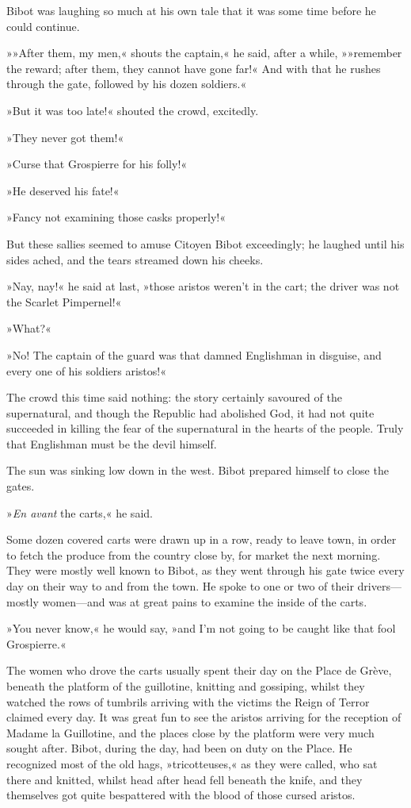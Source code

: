 Bibot was laughing so much at his own tale that it was some time before he could continue.

»»After them, my men,« shouts the captain,« he said, after a while, »»remember the reward; after them, they cannot have gone far!« And with that he rushes through the gate, followed by his dozen soldiers.«

»But it was too late!« shouted the crowd, excitedly.

»They never got them!«

»Curse that Grospierre for his folly!«

»He deserved his fate!«

»Fancy not examining those casks properly!«

But these sallies seemed to amuse Citoyen Bibot exceedingly; he laughed until his sides ached, and the tears streamed down his cheeks.

»Nay, nay!« he said at last, »those aristos weren't in the cart; the driver was not the Scarlet Pimpernel!«

»What?«

»No! The captain of the guard was that damned Englishman in disguise, and every one of his soldiers aristos!«

The crowd this time said nothing: the story certainly savoured of the supernatural, and though the Republic had abolished God, it had not quite succeeded in killing the fear of the supernatural in the hearts of the people. Truly that Englishman must be the devil himself.

The sun was sinking low down in the west. Bibot prepared himself to close the gates.

»\textit{En avant} the carts,« he said.

Some dozen covered carts were drawn up in a row, ready to leave town, in order to fetch the produce from the country close by, for market the next morning. They were mostly well known to Bibot, as they went through his gate twice every day on their way to and from the town. He spoke to one or two of their drivers—mostly women—and was at great pains to examine the inside of the carts.

»You never know,« he would say, »and I'm not going to be caught like that fool Grospierre.«

The women who drove the carts usually spent their day on the Place de Grève, beneath the platform of the guillotine, knitting and gossiping, whilst they watched the rows of tumbrils arriving with the victims the Reign of Terror claimed every day. It was great fun to see the aristos arriving for the reception of Madame la Guillotine, and the places close by the platform were very much sought after. Bibot, during the day, had been on duty on the Place. He recognized most of the old hags, »tricotteuses,« as they were called, who sat there and knitted, whilst head after head fell beneath the knife, and they themselves got quite bespattered with the blood of those cursed aristos.

